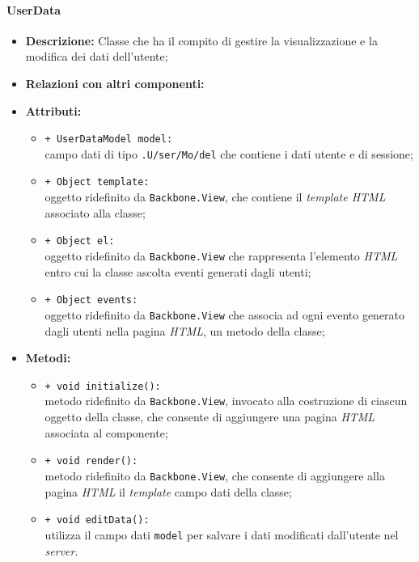 \paragraph{UserData}
\begin{flushleft}
\begin{itemize}
\item \textbf{Descrizione:} Classe che ha il compito di gestire la visualizzazione e la modifica dei dati dell'utente;
\item \textbf{Relazioni con altri componenti:}
\item \textbf{Attributi:}
\begin{sloppypar}
\begin{itemize}
\item \texttt{+ UserDataModel model:}\\ campo dati di tipo \texttt{\model{}.U\fshyp{}ser\fshyp{}Mo\fshyp{}del} che contiene i dati utente e di sessione;
\item \texttt{+ Object template:}\\ oggetto ridefinito da \texttt{Backbone.View}, che contiene il \textit{template HTML} associato alla classe;
\item \texttt{+ Object el:}\\ oggetto ridefinito da \texttt{Backbone.View} che rappresenta l'elemento \textit{HTML} entro cui la classe ascolta eventi generati dagli utenti;
\item \texttt{+ Object events:}\\ oggetto ridefinito da \texttt{Backbone.View} che associa ad ogni evento generato dagli utenti nella pagina \textit{HTML}, un metodo della classe;
\end{itemize}
\end{sloppypar}
\item \textbf{Metodi:}
\begin{sloppypar}
\begin{itemize}
\item \texttt{+ void initialize():}\\ metodo ridefinito da \texttt{Backbone.View}, invocato alla costruzione di ciascun oggetto della classe, che consente di aggiungere una pagina \textit{HTML} associata al componente;
\item \texttt{+ void render():}\\ metodo ridefinito da \texttt{Backbone.View}, che consente di aggiungere alla pagina \textit{HTML} il \textit{template} campo dati della classe;
\item \texttt{+ void editData():}\\ utilizza il campo dati \texttt{model} per salvare i dati modificati dall'utente nel \textit{server}.
\end{itemize}
\end{sloppypar}
\end{itemize}
\end{flushleft}


